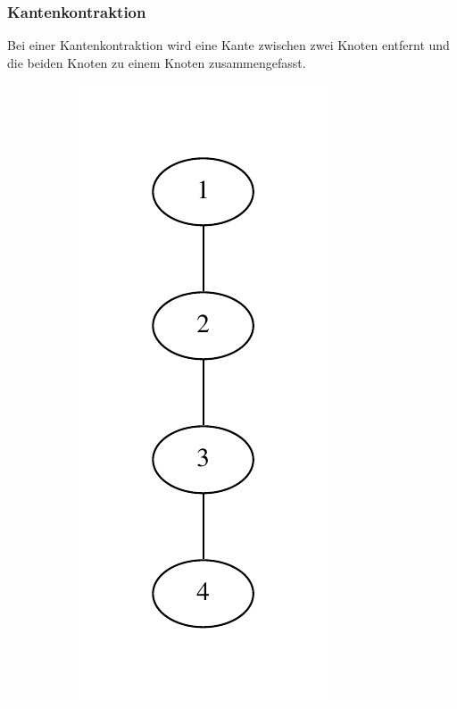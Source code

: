 \documentclass{scrartcl}
\begin{document}
\subsubsection{Kantenkontraktion}

\label{kantenkontraktion}

Bei einer Kantenkontraktion wird eine Kante zwischen zwei Knoten entfernt und 
die beiden Knoten zu einem Knoten zusammengefasst.

\begin{figure}[h!!!]
\centering
\begin{subfigure}{.5\textwidth}
	\centering
	\includegraphics{kontrakt.pdf}
\end{subfigure}%
\begin{subfigure}{.5\textwidth}
	\centering

\end{subfigure}
\end{figure}
\end{document}
